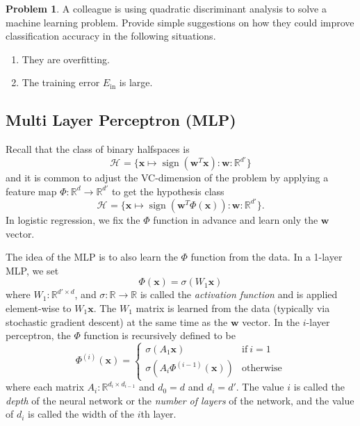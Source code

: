 \documentclass[10pt]{exam}
\theoremstyle{definition}
\newtheorem{problem}{Problem}
\newcommand{\R}{\mathbb R}
\DeclareMathOperator{\sign}{sign}
\newcommand{\Ein}{E_{\text{in}}}
\newcommand{\trans}[1]{{#1}^{T}}
\newcommand{\w}{\mathbf w}
\newcommand{\x}{\mathbf x}
\newcommand{\HH}[1]{\mathcal H_{\text{#1}}}
\begin{document}
\newpage
\begin{problem}
    A colleague is using quadratic discriminant analysis to solve a machine learning problem.
    Provide simple suggestions on how they could improve classification accuracy in the following situations.
    \begin{enumerate}
        \item
            They are overfitting.
            \vspace{4in}
        \item
            The training error $\Ein$ is large.
    \end{enumerate}
\end{problem}


\newpage
\subsection{Multi Layer Perceptron (MLP)}

Recall that the class of binary halfspaces is
\begin{equation}
    \HH{} = \bigg\{ \x \mapsto \sign(\trans\w \x) : \w : \R^{d'} \bigg\}
\end{equation}
and it is common to adjust the VC-dimension of the problem by applying a feature map
$\Phi : \R^d \to \R^{d'}$ to get the hypothesis class
\begin{equation}
    \HH{} = \bigg\{ \x \mapsto \sign(\trans\w \Phi(\x)) : \w : \R^{d'} \bigg\}
    .
\end{equation}
In logistic regression, we fix the $\Phi$ function in advance and learn only the $\w$ vector.

The idea of the MLP is to also learn the $\Phi$ function from the data.
In a 1-layer MLP, we set
\begin{equation}
    \Phi(\x) = \sigma ( W_1 \x)
\end{equation}
where $W_1 : \R^{d'\times d}$,
and $\sigma : \R \to \R$ is called the \emph{activation function} and is applied element-wise to $W_1\x$.
The $W_1$ matrix is learned from the data (typically via stochastic gradient descent) at the same time as the $\w$ vector.
In the $i$-layer perceptron, the $\Phi$ function is recursively defined to be
\begin{equation}
    \Phi^{(i)}(\x) =
    \begin{cases}
        \sigma (A_1 \x) & \text{if}~i = 1 \\
        \sigma (A_i \Phi^{(i-1)}(\x)) & \text{otherwise}
    \end{cases}
\end{equation}
where each matrix $A_i : \R^{d_i \times d_{i-1}}$ and $d_0 = d$ and $d_i = d'$.
The value $i$ is called the \emph{depth} of the neural network or the \emph{number of layers} of the network, and the value of $d_i$ is called the width of the $i$th layer.
\end{document}
